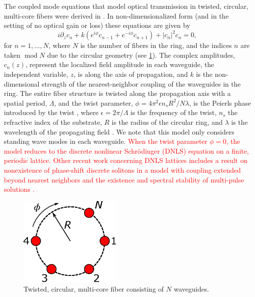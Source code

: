 \documentclass[11pt,reqno]{amsart}
\DeclareMathOperator{\md}{mod}
\newcommand{\revised}[1]{ \textcolor{red}{#1} }
\begin{document}
The coupled mode equations that model optical transmission in twisted, circular, multi-core fibers were derived in \cite{Longhi2007,Longhi2007b,Garanovich2012}. In non-dimensionalized form (and in the setting of no optical gain or loss) these equations are given by
\begin{equation}\label{eq:coupledmode}
i \partial_z c_n + k \left(e^{i\phi}c_{n-1} + e^{-i\phi}c_{n+1} \right) + |c_n|^2 c_n = 0,
\end{equation}
for $n = 1, \dots, N$, where $N$ is the number of fibers in the ring, and the indices $n$ are taken $\md N$ due to the circular geometry (see \cref{fig:circle}).
The complex amplitudes, $c_n(z)$, represent the localized field amplitude in each waveguide, the independent variable, $z$, is along the axis of propagation, and $k$ is the non-dimensional strength of the nearest-neighbor coupling of the waveguides in the ring. The entire fiber structure is twisted along the propagation axis with a spatial period, $\Lambda$, and the twist parameter, $\phi = 4 \pi^2 \epsilon n_s R^2/N \lambda$, is the Peierls phase introduced by the twist \cite{Longhi2007,Peierls1933}, where $\epsilon = 2 \pi / \Lambda$ is the frequency of the twist, $n_s$ the refractive index of the substrate, $R$ is the radius of the circular ring, and $\lambda$ is the wavelength of the propagating field \cite{castro2016,Parto2017}. We note that this model only considers standing wave modes in each waveguide. 
\revised{
When the twist parameter $\phi = 0$, the model reduces to the discrete nonlinear Schr\"odinger (DNLS) equation \cite{Kevrekidis2009} on a finite, periodic lattice. Other recent work concerning DNLS lattices includes a result on nonexistence of phase-shift discrete solitons in a model with coupling extended beyond nearest neighbors \cite{penati2018} and the existence and spectral stability of multi-pulse solutions \cite{Parker2020}.
}

\begin{figure}
\begin{center}
\includegraphics[width=5cm]{circle}
\end{center}
\caption{Twisted, circular, multi-core fiber consisting of $N$ waveguides.}
\label{fig:circle}
\end{figure}
\end{document}
